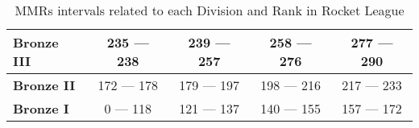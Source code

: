 \begin{table}[]
\begin{tabular}{|l|c|c|c|c|}
    \textbf{Bronze III}           & 235 — 238                                & 239 — 257                                 & 258 — 276                                  & 277 — 290                                 \\ \hline
    \textbf{Bronze II}            & 172 — 178                                & 179 — 197                                 & 198 — 216                                  & 217 — 233                                 \\ \hline
    \textbf{Bronze I}             & 0 — 118                                  & 121 — 137                                 & 140 — 155                                  & 157 — 172                                 \\ \hline
    \end{tabular}
    \caption{MMRs intervals related to each Division and Rank in Rocket League}
    \label{tab:mmrs}
\end{table}
